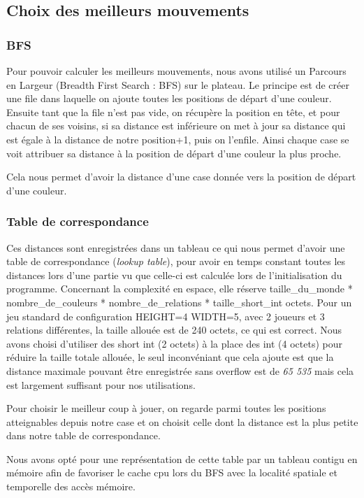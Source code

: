 \subsection{Choix des meilleurs mouvements}
\subsubsection{BFS}
Pour pouvoir calculer les meilleurs mouvements, nous avons utilisé un Parcours en Largeur (Breadth First Search : BFS) sur le plateau. 
Le principe est de créer une file dans laquelle on ajoute toutes les positions de départ d'une couleur.
Ensuite tant que la file n'est pas vide, on récupère la position en tête, et pour chacun de ses voisins, 
si sa distance est inférieure on met à jour sa distance qui est égale à la distance de notre position+1,
puis on l'enfile.
Ainsi chaque case se voit attribuer sa distance à la position de départ d'une couleur la plus proche. 
 
Cela nous permet d'avoir la distance d'une case donnée vers la position de départ d'une couleur.
\subsubsection{Table de correspondance}

Ces distances sont enregistrées dans un tableau ce qui nous permet d'avoir une table de correspondance (\emph{lookup table}),
pour avoir en temps constant toutes les distances lors d'une partie vu que celle-ci est calculée lors de l'initialisation
du programme. Concernant la complexité en espace, elle réserve 
taille\_du\_monde * nombre\_de\_couleurs * nombre\_de\_relations * taille\_short\_int octets. Pour un jeu standard de configuration
 HEIGHT=4 WIDTH=5, avec 2 joueurs et 3 relations différentes, la taille allouée est de 240 octets, ce qui est correct.
Nous avons choisi d'utiliser des short int (2 octets) à la place des int (4 octets) pour réduire la taille totale allouée,
le seul inconvéniant que cela ajoute est que la distance maximale pouvant être enregistrée sans overflow est de \emph{65 535} mais cela
est largement suffisant pour nos utilisations.

Pour choisir le meilleur coup à jouer, on regarde parmi toutes les positions atteignables depuis 
notre case et on choisit celle dont la distance est la plus petite dans notre table de correspondance.

Nous avons opté pour une représentation de cette table par un tableau contigu en mémoire afin de favoriser le cache cpu
lors du BFS avec la localité spatiale et temporelle des accès mémoire. 

